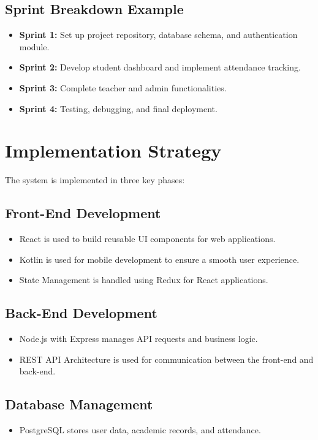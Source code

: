 \subsection{Sprint Breakdown Example}
\begin{itemize}
    \item \textbf{Sprint 1:} Set up project repository, database schema, and authentication module.
    \item \textbf{Sprint 2:} Develop student dashboard and implement attendance tracking.
    \item \textbf{Sprint 3:} Complete teacher and admin functionalities.
    \item \textbf{Sprint 4:} Testing, debugging, and final deployment.
\end{itemize}

\section{Implementation Strategy}
The system is implemented in three key phases:

\subsection{Front-End Development}
\begin{itemize}
    \item React is used to build reusable UI components for web applications.
    \item Kotlin is used for mobile development to ensure a smooth user experience.
    \item State Management is handled using Redux for React applications.
\end{itemize}

\subsection{Back-End Development}
\begin{itemize}
    \item Node.js with Express manages API requests and business logic.
    \item REST API Architecture is used for communication between the front-end and back-end.
\end{itemize}

\subsection{Database Management}
\begin{itemize}
    \item PostgreSQL stores user data, academic records, and attendance.
\end{itemize}

